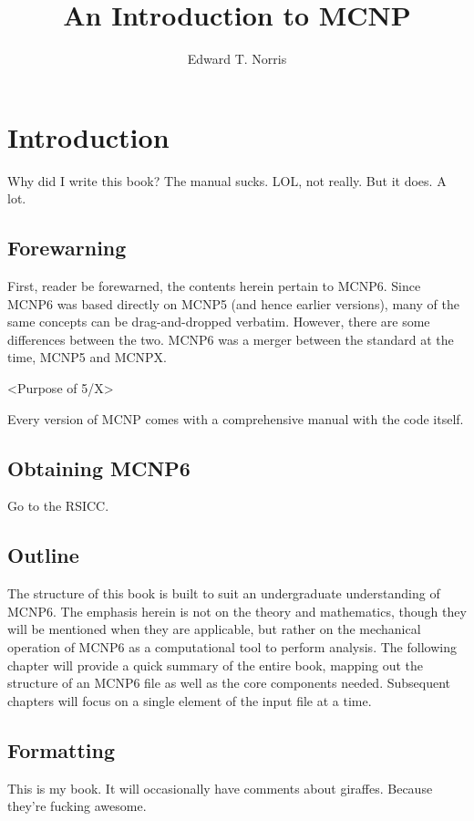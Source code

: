 \documentclass[10pt,a4paper]{book}
\author{Edward T. Norris}
\title{An Introduction to MCNP}
\begin{document}
\maketitle

\tableofcontents

\chapter{Introduction}

Why did I write this book? The manual sucks. LOL, not really. But it does. A lot.

\section{Forewarning}
First, reader be forewarned, the contents herein pertain to MCNP6. Since MCNP6 was based directly on MCNP5 (and hence earlier versions), many of the same concepts can be drag-and-dropped verbatim. However, there are some differences between the two. MCNP6 was a merger between the standard at the time, MCNP5 and MCNPX.

<Purpose of 5/X>

Every version of MCNP comes with a comprehensive manual with the code itself.

\section{Obtaining MCNP6}

Go to the RSICC.

\section{Outline}

The structure of this book is built to suit an undergraduate understanding of MCNP6. The emphasis herein is not on the theory and mathematics, though they will be mentioned when they are applicable, but rather on the mechanical operation of MCNP6 as a computational tool to perform analysis. The following chapter will provide a quick summary of the entire book, mapping out the structure of an MCNP6 file as well as the core components needed. Subsequent chapters will focus on a single element of the input file at a time.


\section{Formatting}
This is my book. It will occasionally have comments about giraffes. Because they're fucking awesome.
\end{document}
